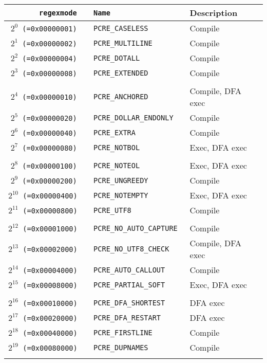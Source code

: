 \documentclass[documentation]{subfiles}
\begin{document}
\begin{longtable}{>{\tt}r>{\tt}ll}
    \toprule
    {\bf regexmode} & {\bf Name} & {\bf Description} \\
    \midrule\endhead%
    $2^{0}$  (=0x00000001) & PCRE\_CASELESS            & Compile\\
    $2^{1}$  (=0x00000002) & PCRE\_MULTILINE           & Compile\\
    $2^{2}$  (=0x00000004) & PCRE\_DOTALL              & Compile\\
    $2^{3}$  (=0x00000008) & PCRE\_EXTENDED            & Compile\\
    \\
    $2^{4}$  (=0x00000010) & PCRE\_ANCHORED            & Compile, DFA exec\\
    $2^{5}$  (=0x00000020) & PCRE\_DOLLAR\_ENDONLY     & Compile\\
    $2^{6}$  (=0x00000040) & PCRE\_EXTRA               & Compile\\
    $2^{7}$  (=0x00000080) & PCRE\_NOTBOL              & Exec, DFA exec\\
    \\
    $2^{8}$  (=0x00000100) & PCRE\_NOTEOL              & Exec, DFA exec\\
    $2^{9}$  (=0x00000200) & PCRE\_UNGREEDY            & Compile\\
    $2^{10}$ (=0x00000400) & PCRE\_NOTEMPTY            & Exec, DFA exec\\
    $2^{11}$ (=0x00000800) & PCRE\_UTF8                & Compile\\
    \\
    $2^{12}$ (=0x00001000) & PCRE\_NO\_AUTO\_CAPTURE   & Compile\\
    $2^{13}$ (=0x00002000) & PCRE\_NO\_UTF8\_CHECK     & Compile, DFA exec\\
    $2^{14}$ (=0x00004000) & PCRE\_AUTO\_CALLOUT       & Compile\\
    $2^{15}$ (=0x00008000) & PCRE\_PARTIAL\_SOFT       & Exec, DFA exec\\
    \\
    $2^{16}$ (=0x00010000) & PCRE\_DFA\_SHORTEST       & DFA exec\\
    $2^{17}$ (=0x00020000) & PCRE\_DFA\_RESTART        & DFA exec\\
    $2^{18}$ (=0x00040000) & PCRE\_FIRSTLINE           & Compile\\
    $2^{19}$ (=0x00080000) & PCRE\_DUPNAMES            & Compile\\
    \\

\end{longtable}
\end{document}
